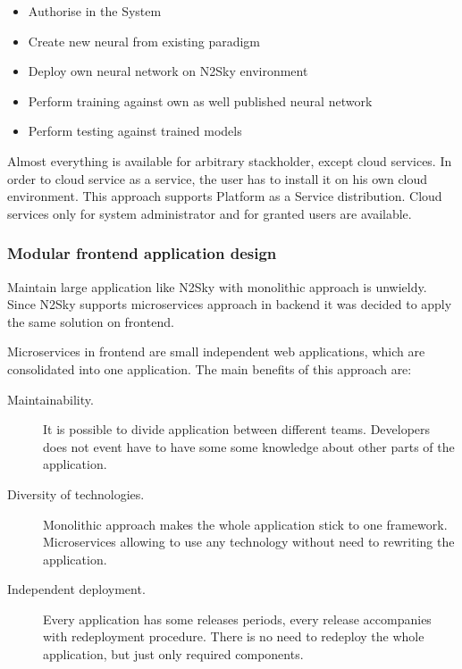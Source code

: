 \begin{itemize}
\item Authorise in the System
\item Create new neural from existing paradigm
\item Deploy own neural network on N2Sky environment 
\item Perform training against own as well published neural network
\item Perform testing against trained models
\end{itemize}

Almost everything is available for arbitrary stackholder, except cloud services. In order to cloud service as a service, the user has to install it on his own cloud environment. This approach supports Platform as a Service distribution. Cloud services only for system administrator and for granted users are available. 


 
 
\subsubsection{Modular frontend application design}\label{Modular frontend application design}
Maintain large application like N2Sky with monolithic approach is unwieldy. Since N2Sky supports microservices approach in backend it was decided to apply the same solution on frontend.  

Microservices in frontend are small independent web applications, which are consolidated into one application. The main benefits of this approach are:
\begin{description}
\item[Maintainability.] It is possible to divide application between different teams. Developers does not event have to have some some knowledge about other parts of the application. 
\item[Diversity of technologies.] Monolithic approach makes the whole application stick to one framework. Microservices allowing to use any technology without need to rewriting the application.
\item[Independent deployment.] Every application has some releases periods, every release accompanies with redeployment procedure. There is no need to redeploy the whole application, but just only required components.
\end{description}

